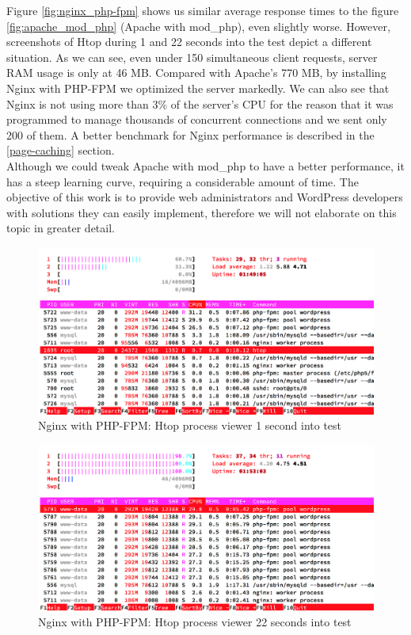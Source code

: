 Figure \ref{fig:nginx_php-fpm} shows us similar average response times to the figure \ref{fig:apache_mod_php} (Apache with mod\_php), even slightly worse. However, screenshots of Htop during 1 and 22 seconds into the test depict a different situation. As we can see, even under 150 simultaneous client requests, server RAM usage is only at 46 MB. Compared with Apache's 770 MB, by installing Nginx with PHP-FPM we optimized the server markedly. We can also see that Nginx is not using more than 3\% of the server's CPU for the reason that it was programmed to manage thousands of concurrent connections and we sent only 200 of them. A better benchmark for Nginx performance is described in the \ref{page-caching} section. \\

Although we could tweak Apache with mod\_php to have a better performance, it has a steep learning curve, requiring a considerable amount of time. The objective of this work is to provide web administrators and WordPress developers with solutions they can easily implement, therefore we will not elaborate on this topic in greater detail. 

\begin{figure}[H]
\begin{center}
\includegraphics[scale=0.5]{figures/Nginx_PHP-FPM_1s.png}
\caption{Nginx with PHP-FPM: Htop process viewer 1 second into test}
\label{fig:nginx_php-fpm_1s}
\end{center}
\end{figure}

\begin{figure}[H]
\begin{center}
\includegraphics[scale=0.5]{figures/Nginx_PHP-FPM_22s.png}
\caption{Nginx with PHP-FPM: Htop process viewer 22 seconds into test}
\label{fig:nginx_php-fpm_22s}
\end{center}
\end{figure}

